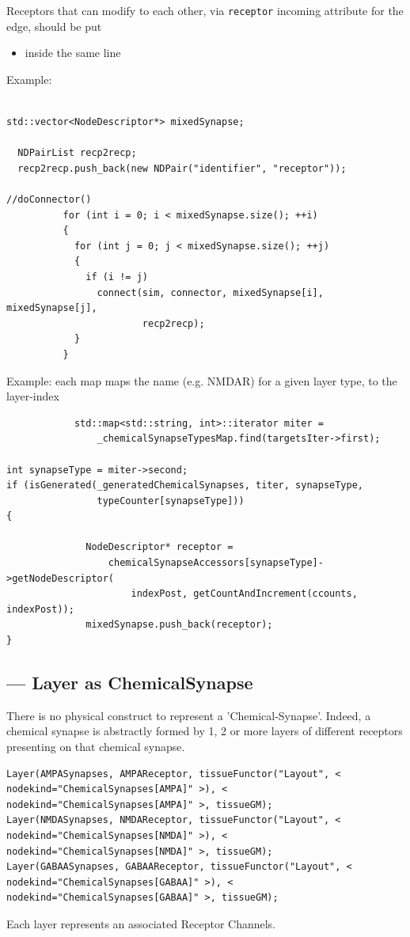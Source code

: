 Receptors that can modify to each other, via \verb!receptor! incoming attribute
for the edge, should be put 
\begin{itemize}
  \item inside the same line
\end{itemize}

Example:
\begin{verbatim}

std::vector<NodeDescriptor*> mixedSynapse;

  NDPairList recp2recp;
  recp2recp.push_back(new NDPair("identifier", "receptor"));

//doConnector()
          for (int i = 0; i < mixedSynapse.size(); ++i)
          {
            for (int j = 0; j < mixedSynapse.size(); ++j)
            {
              if (i != j)
                connect(sim, connector, mixedSynapse[i], mixedSynapse[j],
                        recp2recp);
            }
          }

\end{verbatim}

Example:  each map maps the name (e.g. NMDAR) for a given layer type, to the
layer-index

\begin{verbatim}
            std::map<std::string, int>::iterator miter =
                _chemicalSynapseTypesMap.find(targetsIter->first);

int synapseType = miter->second;
if (isGenerated(_generatedChemicalSynapses, titer, synapseType,
                typeCounter[synapseType]))
{

              NodeDescriptor* receptor =
                  chemicalSynapseAccessors[synapseType]->getNodeDescriptor(
                      indexPost, getCountAndIncrement(ccounts, indexPost));
              mixedSynapse.push_back(receptor);
}
\end{verbatim}


\subsection{--- Layer as ChemicalSynapse}
\label{sec:Layer-as-Synapse}

There is no physical construct to represent a 'Chemical-Synapse'. Indeed, a
chemical synapse is abstractly formed by 1, 2 or more layers of different
receptors presenting on that chemical synapse.

\begin{verbatim}
Layer(AMPASynapses, AMPAReceptor, tissueFunctor("Layout", < nodekind="ChemicalSynapses[AMPA]" >), < nodekind="ChemicalSynapses[AMPA]" >, tissueGM);
Layer(NMDASynapses, NMDAReceptor, tissueFunctor("Layout", < nodekind="ChemicalSynapses[NMDA]" >), < nodekind="ChemicalSynapses[NMDA]" >, tissueGM);
Layer(GABAASynapses, GABAAReceptor, tissueFunctor("Layout", < nodekind="ChemicalSynapses[GABAA]" >), < nodekind="ChemicalSynapses[GABAA]" >, tissueGM);
\end{verbatim}
Each layer represents an associated Receptor Channels.

